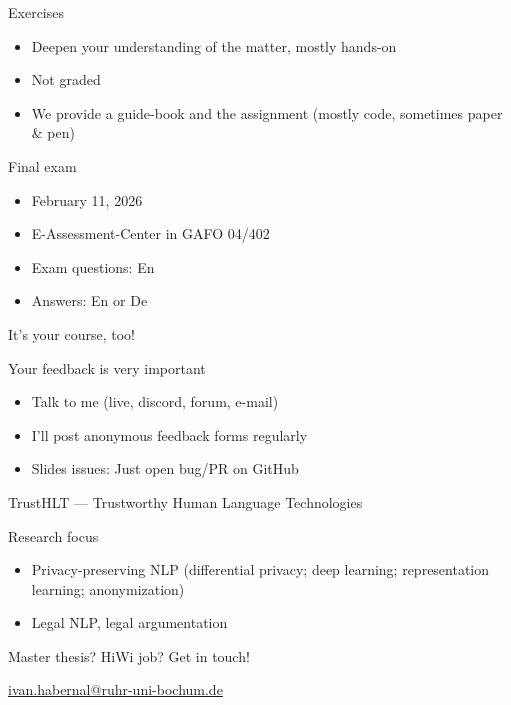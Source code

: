 \documentclass[12pt,aspectratio=169,handout]{beamer}
\begin{document}
\begin{frame}{Exercises}
	
\begin{itemize}
	\item Deepen your understanding of the matter, mostly hands-on
	\item Not graded
	\item We provide a guide-book and the assignment (mostly code, sometimes paper \& pen)
\end{itemize}


\end{frame}

\begin{frame}{Final exam}
	
	
\begin{itemize}
\item February 11, 2026
\item E-Assessment-Center in GAFO 04/402
\item Exam questions: En
\item Answers: En or De
\end{itemize}

\end{frame}



\begin{frame}{It's your course, too!}
	
Your feedback is very important

\begin{itemize}
	\item Talk to me (live, discord, forum, e-mail)
	\item I'll post anonymous feedback forms regularly
	\item Slides issues: Just open bug/PR on GitHub
\end{itemize}


\end{frame}



\begin{frame}{TrustHLT --- Trustworthy Human Language Technologies}
	


\begin{block}{Research focus}
\begin{itemize}
	
	\item Privacy-preserving NLP (differential privacy; deep learning; representation learning; anonymization)	
	\item Legal NLP, legal argumentation
	
\end{itemize}	
\end{block}


	\bigskip
	
	Master thesis? HiWi job? Get in touch!
	
	\url{ivan.habernal@ruhr-uni-bochum.de}
	
\end{frame}
\end{document}
